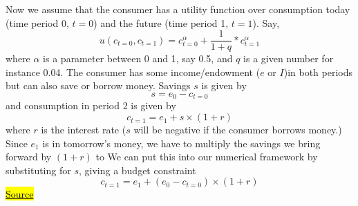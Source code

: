 \documentclass[a4paper, 12pt, reqno]{article}
\begin{document}
Now we assume that the consumer has a utility function over consumption today (time period 0, $t = 0$) and the future (time period 1, $t = 1$). Say, 
$$ u(c_{t = 0},c_{t = 1}) = c_{t = 0}^{\alpha} + \frac{1}{1+q} * c_{t = 1}^{\alpha} $$ 
where $\alpha$ is a parameter between 0 and 1, say 0.5, and $q$ is a given number for instance 0.04. 
The consumer has some income/endowment ($e$ or $I$)in both periods but can also save or borrow money. Savings $s$ is given by 
$$ s = e_0 - c_{t = 0} $$ 
and consumption in period 2 is given by 
$$ c_{t = 1} = e_1 + s \times (1+r)$$ 
where $r$ is the interest rate ($s$ will be negative if the consumer borrows money.) Since $e_1$ is in tomorrow's money, we have to multiply the savings we bring forward by $(1 + r)$ to We can put this into our 
numerical framework by substituting for $s$, giving a budget constraint 
$$ c_{t = 1} = e_1+ (e_0- c_{t = 0}) \times (1+r)$$
\href{https://web.econ.ku.dk/okocg/VM/VM-general/Kapitler%20til%20bog/Ch9-2016-1.pdf}{\hl{Source}} \\
\end{document}
